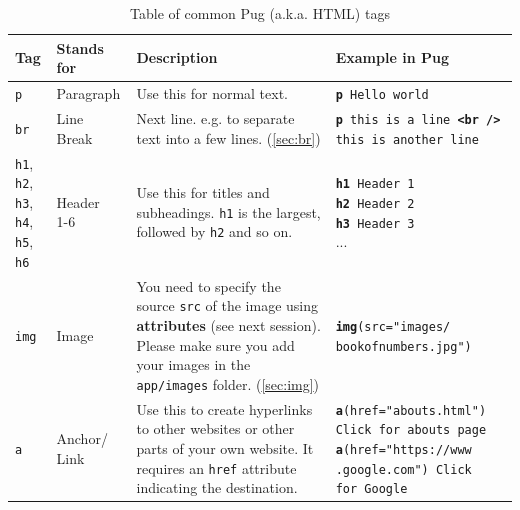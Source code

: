 \begin{table}[H]
    \centering
    \caption{Table of common Pug (a.k.a. HTML) tags}
    \vspace{6mm}
    \begin{tabular}{|m{3.5em}|m{4.5em}|m{12em}|m{13em}|}
        \hline
        \textbf{Tag} & 
        Stands for &    
        Description & 
        Example in Pug
        \\ \hline \hline
        
        \texttt{p} &
        Paragraph & 
        Use this for normal text. &
        \texttt{\textbf{p} Hello world}
        \\ \hline
        
        \texttt{br} &
        Line Break & 
        Next line. e.g. to separate text into a few lines. (\cref{sec:br}) &
        \texttt{\textbf{p} this is a line \textbf{<br />} this is another line}
        \\ \hline
        
        \makecell[lb]{
            \texttt{h1}, \texttt{h2},\\ \texttt{h3}, \texttt{h4},\\ \texttt{h5}, \texttt{h6}
        } &
        \makecell[lb]{
        Header \\ 1-6 
        } & 
        Use this for titles and subheadings. \texttt{h1} is the largest, followed by \texttt{h2} and so on. &
        \makecell[lb]{
            \texttt{\textbf{h1} Header 1} \\
            \texttt{\textbf{h2} Header 2} \\
            \texttt{\textbf{h3} Header 3} \\
            ...
        }
        \\ \hline
        
        \texttt{img} &
        Image & 
        You need to specify the source \texttt{src} of the image using \textbf{attributes} (see next session). Please make sure you add your images in the \texttt{app/images} folder. (\cref{sec:img}) &
        \texttt{\textbf{img}(src="images/ bookofnumbers.jpg")}
        \\ \hline
        
        \texttt{a} &
        Anchor/ Link &
        Use this to create hyperlinks to other websites or other parts of your own website. It requires an \texttt{href} attribute indicating the destination. &
        \makecell[lb]{
            \texttt{\textbf{a}(href="abouts.html")}\\\texttt{Click for abouts page} \\
            \texttt{\textbf{a}(href="https://www}\\\texttt{.google.com") Click}\\\texttt{for Google}
        }
        \\ \hline
        

\end{tabular}
\end{table}

